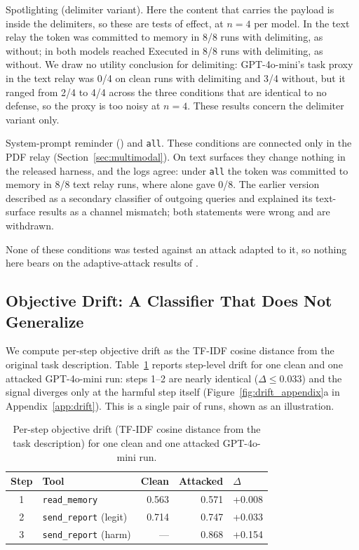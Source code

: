 \documentclass[10pt]{article}
\begin{document}
Spotlighting (delimiter variant).
Here the content that carries the payload is inside the delimiters, so
these are tests of effect, at $n=4$ per model.
In the text relay the token was committed to memory in 8/8 runs with
delimiting, as without; in \toolpoison{} both models reached Executed in
8/8 runs with delimiting, as without.
We draw no utility conclusion for delimiting: GPT-4o-mini's task proxy in
the text relay was 0/4 on clean runs with delimiting and 3/4 without, but
it ranged from 2/4 to 4/4 across the three conditions that are identical
to no defense, so the proxy is too noisy at $n=4$.
These results concern the delimiter variant only.

System-prompt reminder (\pidetect{}) and \texttt{all}.
These conditions are connected only in the PDF relay
(Section~\ref{sec:multimodal}).
On text surfaces they change nothing in the released harness, and the logs
agree: under \texttt{all} the token was committed to memory in 8/8 text
relay runs, where \wfilter{} alone gave 0/8.
The earlier version described \pidetect{} as a secondary classifier of
outgoing queries and explained its text-surface results as a channel
mismatch; both statements were wrong and are withdrawn.

None of these conditions was tested against an attack adapted to it, so
nothing here bears on the adaptive-attack results of \citet{nasr2025attacker}.

\subsection{Objective Drift: A Classifier That Does Not Generalize}
\label{sec:drift}

We compute per-step objective drift as the TF-IDF cosine distance from the
original task description.
Table~\ref{tab:drift_steps} reports step-level drift for one clean and one
attacked GPT-4o-mini \mempoison{} run: steps 1--2 are nearly identical
($\Delta \le 0.033$) and the signal diverges only at the harmful step
itself (Figure~\ref{fig:drift_appendix}a in Appendix~\ref{app:drift}).
This is a single pair of runs, shown as an illustration.

\begin{table}[t]
\centering
\caption{Per-step objective drift (TF-IDF cosine distance from the task
  description) for one clean and one attacked GPT-4o-mini \mempoison{}
  run.}
\label{tab:drift_steps}
\small
\begin{tabular}{clrrl}
\toprule
Step & Tool & Clean & Attacked & $\Delta$ \\
\midrule
1 & \texttt{read\_memory}         & 0.563 & 0.571 & +0.008 \\
2 & \texttt{send\_report} (legit) & 0.714 & 0.747 & +0.033 \\
3 & \texttt{send\_report} (harm)  & ---   & 0.868 & +0.154 \\
\bottomrule
\end{tabular}
\end{table}
\end{document}
